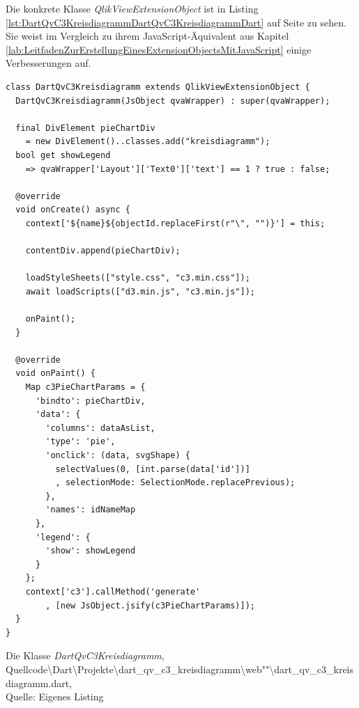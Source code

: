 Die konkrete Klasse \textit{QlikViewExtensionObject} ist in Listing \ref{lst:DartQvC3KreisdiagrammDartQvC3KreisdiagrammDart} auf Seite \pageref{lst:DartQvC3KreisdiagrammDartQvC3KreisdiagrammDart} zu sehen. Sie weist im Vergleich zu ihrem JavaScript-Äquivalent aus Kapitel \ref{lab:LeitfadenZurErstellungEinesExtensionObjectsMitJavaScript} einige Verbesserungen auf.


\ifIncludeFigures\begin{listing}[htbp]
\begin{verbatim}
class DartQvC3Kreisdiagramm extends QlikViewExtensionObject {
  DartQvC3Kreisdiagramm(JsObject qvaWrapper) : super(qvaWrapper);

  final DivElement pieChartDiv 
    = new DivElement()..classes.add("kreisdiagramm");
  bool get showLegend
    => qvaWrapper['Layout']['Text0']['text'] == 1 ? true : false;
  
  @override
  void onCreate() async {
    context['${name}${objectId.replaceFirst(r"\", "")}'] = this;
    
    contentDiv.append(pieChartDiv);

    loadStyleSheets(["style.css", "c3.min.css"]);
    await loadScripts(["d3.min.js", "c3.min.js"]);

    onPaint();
  }

  @override
  void onPaint() {
    Map c3PieChartParams = {
      'bindto': pieChartDiv,
      'data': {
        'columns': dataAsList,
        'type': 'pie',
        'onclick': (data, svgShape) {
          selectValues(0, [int.parse(data['id'])]
          , selectionMode: SelectionMode.replacePrevious);
        },
        'names': idNameMap
      },
      'legend': {
        'show': showLegend
      }
    };
    context['c3'].callMethod('generate'
        , [new JsObject.jsify(c3PieChartParams)]);
  }  
}
\end{verbatim}
\caption[Die Klasse \textit{DartQvC3Kreisdiagramm}]{Die Klasse \textit{DartQvC3Kreisdiagramm}, \\Quellcode\textbackslash{}Dart\textbackslash{}Projekte\textbackslash{}dart\_qv\_c3\_kreisdiagramm\textbackslash{}web""\textbackslash{}dart\_qv\_c3\_kreisdiagramm.dart, \\Quelle: Eigenes Listing}
\label{lst:DartQvC3KreisdiagrammDartQvC3KreisdiagrammDart}
\end{listing}\fi


